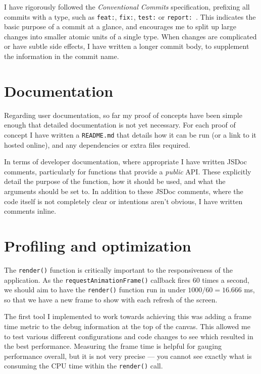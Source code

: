 \documentclass[hyphens]{final_report}
\begin{document}
I have rigorously followed the \emph{Conventional Commits} specification, prefixing all commits with a type, such as \texttt{feat:}, \texttt{fix:}, \texttt{test:} or \texttt{report:}~\cite{conventional-commits}. This indicates the basic purpose of a commit at a glance, and encourages me to split up large changes into smaller atomic units of a single type. When changes are complicated or have subtle side effects, I have written a longer commit body, to supplement the information in the commit name.

\section{Documentation}

Regarding user documentation, so far my proof of concepts have been simple enough that detailed documentation is not yet necessary. For each proof of concept I have written a \texttt{README.md} that details how it can be run (or a link to it hosted online), and any dependencies or extra files required.

In terms of developer documentation, where appropriate I have written JSDoc comments, particularly for functions that provide a \emph{public} API\@. These explicitly detail the purpose of the function, how it should be used, and what the arguments should be set to. In addition to these JSDoc comments, where the code itself is not completely clear or intentions aren't obvious, I have written comments inline.

\section{Profiling and optimization}\label{sec:profiling}

The \texttt{render()} function is critically important to the responsiveness of the application. As the \texttt{requestAnimationFrame()} callback fires 60 times a second, we should aim to have the \texttt{render()} function run in under \(1000/60=16.666\) ms, so that we have a new frame to show with each refresh of the screen. 

The first tool I implemented to work towards achieving this was adding a frame time metric to the debug information at the top of the canvas. This allowed me to test various different configurations and code changes to see which resulted in the best performance. Measuring the frame time is helpful for gauging performance overall, but it is not very precise --- you cannot see exactly what is consuming the CPU time within the \texttt{render()} call.
\end{document}
